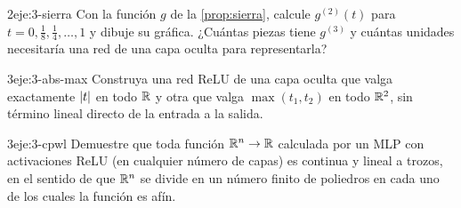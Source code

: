\begin{ejercicio}{2}{eje:3-sierra}
Con la función $g$ de la \cref{prop:sierra}, calcule $g^{(2)}(t)$ para $t=0,\tfrac18,\tfrac14,\dots,1$ y dibuje su gráfica. ¿Cuántas piezas tiene $g^{(3)}$ y cuántas unidades necesitaría una red de una capa oculta para representarla?
\end{ejercicio}

\begin{ejercicio}{3}{eje:3-abs-max}
Construya una red ReLU de una capa oculta que valga exactamente $\lvert t\rvert$ en todo $\mathbb{R}$ y otra que valga $\max(t_1,t_2)$ en todo $\mathbb{R}^{2}$, sin término lineal directo de la entrada a la salida.
\end{ejercicio}

\begin{ejercicio}{3}{eje:3-cpwl}
Demuestre que toda función $\mathbb{R}^{n}\to\mathbb{R}$ calculada por un MLP con activaciones ReLU (en cualquier número de capas) es continua y lineal a trozos, en el sentido de que $\mathbb{R}^{n}$ se divide en un número finito de poliedros en cada uno de los cuales la función es afín.
\end{ejercicio}
